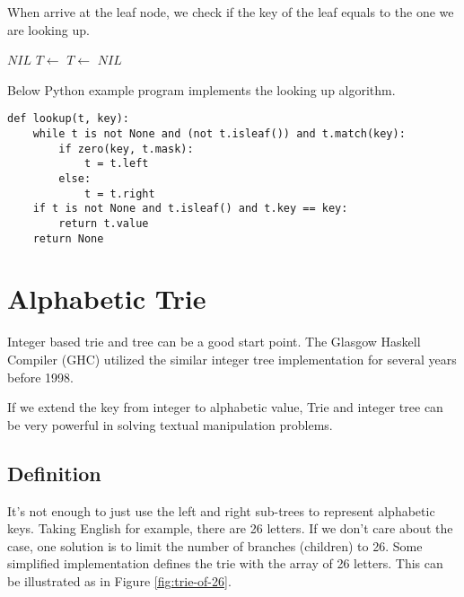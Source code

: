 \documentclass{article}
\begin{document}
When arrive at the leaf node, we check if the key of the
leaf equals to the one we are looking up.

\begin{algorithmic}[1]
    \State \Return $NIL$ 
  \EndIf
      \State $T \gets$ 
    \Else
      \State $T \gets$ 
    \EndIf
  \EndWhile
    \State \Return {}
  \Else
    \State \Return $NIL$ 
  \EndIf
\EndFunction
\end{algorithmic}

Below Python example program implements the looking up algorithm.

\lstset{language=Python}
\begin{lstlisting}
def lookup(t, key):
    while t is not None and (not t.isleaf()) and t.match(key):
        if zero(key, t.mask):
            t = t.left
        else:
            t = t.right
    if t is not None and t.isleaf() and t.key == key:
        return t.value
    return None
\end{lstlisting}


\section{Alphabetic Trie}
Integer based trie and tree can be a good start point. The
Glasgow Haskell Compiler (GHC) utilized the similar integer tree
implementation for several years before 1998\cite{okasaki-int-map}.

If we extend the key from integer to alphabetic
value, Trie and integer tree can be very powerful in solving
textual manipulation problems.

\subsection{Definition}
It's not enough to just use the left and right sub-trees to represent
alphabetic keys. Taking English for example, there are 26 letters.
If we don't care about the case, one solution is to limit the number
of branches (children) to 26. Some simplified implementation defines
the trie with the array of 26 letters.
This can be illustrated as in Figure \ref{fig:trie-of-26}.
\end{document}
